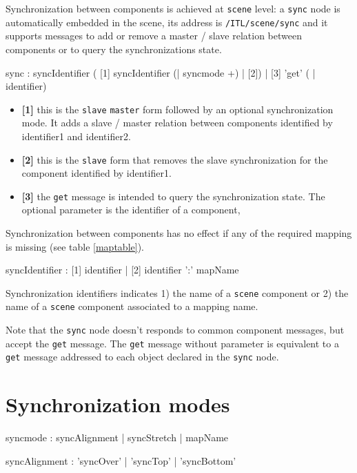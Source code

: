 \documentclass[a4paper,twoside]{report}
\newcommand{\sublevel}[1]	{\section{#1}}
\newcommand{\OSC}[1]		{\texttt{#1}}
\begin{document}
Synchronization between components is achieved at \OSC{scene} level: a \OSC{sync} node is automatically embedded in the scene, its address is \OSC{/ITL/scene/sync} and it supports messages to add or remove a master / slave relation between components or to query the synchronizations state.
\begin{rail}
sync : syncIdentifier 
	 ( [1] syncIdentifier (| syncmode +) 
	   | [2])
	   | [3] 'get' ( | identifier)
\end{rail}


\begin{itemize}
\item \textbf{[1]} this is the \OSC{slave} \OSC{master} form followed by an optional synchronization mode. It adds a slave / master relation between components identified by identifier1 and identifier2. \\
\item \textbf{[2]} this is the \OSC{slave} form that removes the slave synchronization for the component identified by identifier1.
\item \textbf{[3]} the \OSC{get} message is intended to query the synchronization state. The optional parameter is the identifier of a component,
\end{itemize}
Synchronization between components has no effect if any of the required mapping is missing (see table \ref{maptable}).

\begin{rail}
syncIdentifier : [1] identifier 
		| [2] identifier ':' mapName
\end{rail}

Synchronization identifiers indicates 1) the name of a \OSC{scene} component or 2) the name of a \OSC{scene} component associated to a mapping name.


Note that the \OSC{sync} node doesn't responds to common component messages, but accept the \OSC{get} message. 
The \OSC{get} message without parameter is equivalent to a \OSC{get} message addressed to each object declared in the \OSC{sync} node.

\sublevel{Synchronization modes}

\begin{rail}
syncmode : syncAlignment | syncStretch | mapName
\end{rail}

\begin{rail}
syncAlignment : 'syncOver' | 'syncTop' | 'syncBottom'
\end{rail}
\end{document}
